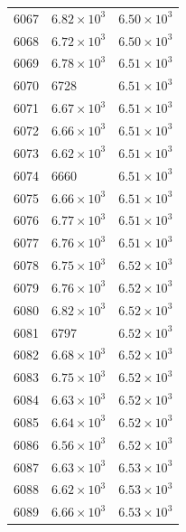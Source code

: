 \begin{table}[H]
\begin{tabular}{lll}
6067 & $\displaystyle 6.82 \times 10^{3}$ & $\displaystyle 6.50 \times 10^{3}$ \\
6068 & $\displaystyle 6.72 \times 10^{3}$ & $\displaystyle 6.50 \times 10^{3}$ \\
6069 & $\displaystyle 6.78 \times 10^{3}$ & $\displaystyle 6.51 \times 10^{3}$ \\
6070 & 6728 & $\displaystyle 6.51 \times 10^{3}$ \\
6071 & $\displaystyle 6.67 \times 10^{3}$ & $\displaystyle 6.51 \times 10^{3}$ \\
6072 & $\displaystyle 6.66 \times 10^{3}$ & $\displaystyle 6.51 \times 10^{3}$ \\
6073 & $\displaystyle 6.62 \times 10^{3}$ & $\displaystyle 6.51 \times 10^{3}$ \\
6074 & 6660 & $\displaystyle 6.51 \times 10^{3}$ \\
6075 & $\displaystyle 6.66 \times 10^{3}$ & $\displaystyle 6.51 \times 10^{3}$ \\
6076 & $\displaystyle 6.77 \times 10^{3}$ & $\displaystyle 6.51 \times 10^{3}$ \\
6077 & $\displaystyle 6.76 \times 10^{3}$ & $\displaystyle 6.51 \times 10^{3}$ \\
6078 & $\displaystyle 6.75 \times 10^{3}$ & $\displaystyle 6.52 \times 10^{3}$ \\
6079 & $\displaystyle 6.76 \times 10^{3}$ & $\displaystyle 6.52 \times 10^{3}$ \\
6080 & $\displaystyle 6.82 \times 10^{3}$ & $\displaystyle 6.52 \times 10^{3}$ \\
6081 & 6797 & $\displaystyle 6.52 \times 10^{3}$ \\
6082 & $\displaystyle 6.68 \times 10^{3}$ & $\displaystyle 6.52 \times 10^{3}$ \\
6083 & $\displaystyle 6.75 \times 10^{3}$ & $\displaystyle 6.52 \times 10^{3}$ \\
6084 & $\displaystyle 6.63 \times 10^{3}$ & $\displaystyle 6.52 \times 10^{3}$ \\
6085 & $\displaystyle 6.64 \times 10^{3}$ & $\displaystyle 6.52 \times 10^{3}$ \\
6086 & $\displaystyle 6.56 \times 10^{3}$ & $\displaystyle 6.52 \times 10^{3}$ \\
6087 & $\displaystyle 6.63 \times 10^{3}$ & $\displaystyle 6.53 \times 10^{3}$ \\
6088 & $\displaystyle 6.62 \times 10^{3}$ & $\displaystyle 6.53 \times 10^{3}$ \\
6089 & $\displaystyle 6.66 \times 10^{3}$ & $\displaystyle 6.53 \times 10^{3}$ \\

\end{tabular}
\end{table}
